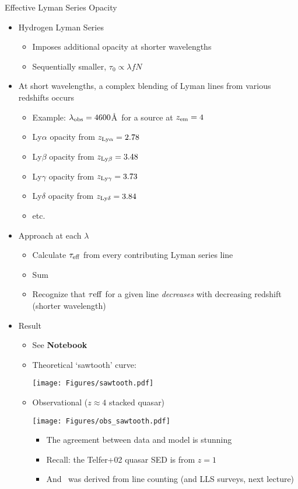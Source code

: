\documentclass[12pt,letterpaper]{article}
\begin{document}
\begin{Aenumerate}
{\bf \item Effective Lyman Series Opacity}
	\begin{itemize}
	\item Hydrogen Lyman Series
		\begin{itemize}
		\item Imposes additional opacity at shorter wavelengths
		\item Sequentially smaller, $\tau_0 \propto \lambda f N$
		\end{itemize}
	\item At short wavelengths, a complex blending of Lyman lines
	from various redshifts occurs
		\begin{itemize}
		\item Example:  $\lambda_{\rm obs} = 4600$\AA\ for a source
		at $z_{\rm em} = 4$
		\item Ly$\alpha$ opacity from $z_{\rm Ly\alpha} = 2.78$
		\item Ly$\beta$ opacity from $z_{\rm Ly\beta} = 3.48$
		\item Ly$\gamma$ opacity from $z_{\rm Ly\gamma} = 3.73$
		\item Ly$\delta$ opacity from $z_{\rm Ly\delta} = 3.84$
		\item etc.
		\end{itemize}
	\item Approach at each $\lambda$
		\begin{itemize}
		\item Calculate $\tau_{\rm eff}$ from every contributing
		Lyman series line
		\item Sum
		\item Recognize that $\tau{\rm eff}$ for a given line {\it decreases}
		with decreasing redshift (shorter wavelength)
		\end{itemize}
	\item Result
		\begin{itemize}
		\item See {\bf Notebook}
		\item Theoretical `sawtooth' curve:

	\texttt{[image: Figures/sawtooth.pdf]}

		\item Observational ($z \approx 4$ stacked quasar)

	\texttt{[image: Figures/obs\_sawtooth.pdf]}
			\begin{itemize}
			\item The agreement between data and model is stunning
			\item Recall: the Telfer+02 quasar SED is from $z=1$
			\item And \fnhi\ was derived from line counting (and LLS
			surveys, next lecture)
			\end{itemize}


\end{itemize}
\end{itemize}
\end{Aenumerate}
\end{document}
